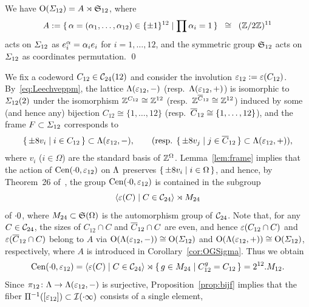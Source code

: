 \documentclass{amsart} %
\begin{document}
%
\begin{corollary}\label{cor:OGSigma}
We have $\mathord{\mathrm{O}}(\varSigma_{12})=A\rtimes\mathord{\mathfrak{S}}_{12}$,
where
\[
A:=\{\,{\alpha=(\alpha_1, \dots, \alpha_{12})\in \{\pm 1\}^{12}}\mid {\prod\alpha_i=1} \,\}\;\; \cong\;\; (\mathord{\mathbb{Z}}/2\mathord{\mathbb{Z}})^{11}
\]
acts on $\varSigma_{12}$ as $e_i\sp{\alpha}=\alpha_i e_i$ for $i=1, \dots, 12$, 
and
the symmetric group $\mathord{\mathfrak{S}}_{12}$ 
acts on $\varSigma_{12}$ as coordinates permutation.
\qed
\end{corollary}
%
We fix a codeword $C_{12}\in \mathord{\mathcal{C}}_{24}(12)$ and 
consider the involution 
$\varepsilon_{12}:=\varepsilon(C_{12})$.
%
By~\eqref{eq:Leechveppm}, 
the lattice $\Lambda (\varepsilon_{12}, -)$ (resp.~$\Lambda (\varepsilon_{12}, +)$)
is isomorphic 
 to $\varSigma_{12} (2)$ under 
the isomorphism $\mathord{\mathbb{Z}}^{C_{12}}\cong \mathord{\mathbb{Z}}^{12}$ (resp.~$\mathord{\mathbb{Z}}^{\overline{C}_{12}}\cong \mathord{\mathbb{Z}}^{12}$)
induced by some (and hence any) bijection 
$C_{12}\cong \{1, \dots, 12\}$ (resp.~$\overline{C}_{12}\cong \{1, \dots, 12\}$),
and the frame $F\subset \varSigma_{12}$ corresponds to
\[
\{\,{\pm 8 v_i}\mid {i\in C_{12}} \,\}\subset \Lambda(\varepsilon_{12}, -),
\qquad 
(\textrm{resp. }
\{\,{\pm 8 v_j}\mid {j\in \overline{C}_{12}} \,\}\subset \Lambda(\varepsilon_{12}, +)),
\]
where $v_i$ ($i\in \Omega$) are the standard basis of $\mathord{\mathbb{Z}}^{\Omega}$.
Lemma~\ref{lem:frame}
implies that the action of $\mathrm{Cen}(\cdot 0, \varepsilon_{12})$ 
on $\Lambda$ preserves  $\{\,{\pm 8 v_i}\mid {i\in \Omega} \,\}$,
and hence, by Theorem~26 of~\cite[Chapter~10, Section~3.3]{theCSbook}, 
the group $\mathrm{Cen}(\cdot 0, \varepsilon_{12}) $ is contained 
in the subgroup
\[
\langle {\varepsilon(C) \mid C \in \mathord{\mathcal{C}}_{24}} \rangle\rtimes M_{24} 
\]
of $\cdot 0$,
where $M_{24}\subset \mathord{\mathfrak{S}}(\Omega)$ is the automorphism group of $ \mathord{\mathcal{C}}_{24}$.
Note that, for any $C\in \mathord{\mathcal{C}}_{24}$,
the sizes of $C_{12}\cap C$ and $\overline{C}_{12}\cap C$
are even, and hence 
$\varepsilon(C_{12}\cap C)$ and $\varepsilon( \overline{C}_{12}\cap C)$ belong to $ A$ via 
$ \mathord{\mathrm{O}}(\Lambda(\varepsilon_{12}, -))\cong \mathord{\mathrm{O}}(\varSigma_{12})$ and $ \mathord{\mathrm{O}}(\Lambda(\varepsilon_{12}, +))\cong \mathord{\mathrm{O}}(\varSigma_{12})$,
respectively,
where $A$ is introduced in Corollary~\ref{cor:OGSigma}.
Thus we obtain 
%
\begin{equation}\label{eq:M12}
\mathrm{Cen}(\cdot 0, \varepsilon_{12})=\langle {\varepsilon(C) \mid C \in \mathord{\mathcal{C}}_{24}} \rangle\rtimes \{\,{g\in M_{24}}\mid {C_{12}^g=C_{12}} \,\}=2^{12}. M_{12}.
\end{equation}
%
Since $\pi_{12}\colon \Lambda\to \Lambda(\varepsilon_{12}, -)$ is surjective,
Proposition~\ref{prop:bijf} implies that the fiber $\Pi^{-1} ([\varepsilon_{12}])\subset \mathord{\mathcal{I}}(\cdot \infty)$ consists of a single element,
\end{document}
